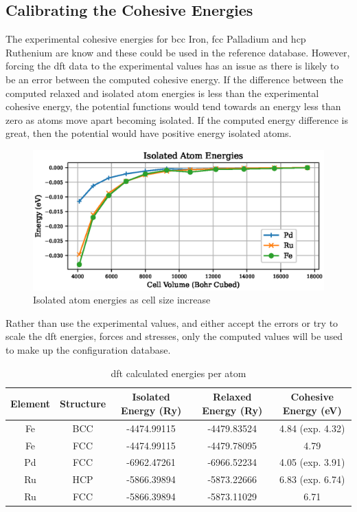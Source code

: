 



\subsection{Calibrating the Cohesive Energies}

The experimental cohesive energies for \acrshort{bcc} Iron, \acrshort{fcc} Palladium and \acrshort{hcp} Ruthenium are know and these could be used in the reference database.  However, forcing the \acrshort{dft} data to the experimental values has an issue as there is likely to be an error between the computed cohesive energy.  If the difference between the computed relaxed and isolated atom energies is less than the experimental cohesive energy, the potential functions would tend towards an energy less than zero as atoms move apart becoming isolated.  If the computed energy difference is great, then the potential would have positive energy isolated atoms.  

\begin{figure}[h]
\begin{center}
\includegraphics[width=0.5\linewidth]{chapters/results_dft_reference_db/isolated/isolated_63.eps}
\caption{Isolated atom energies as cell size increase}
\label{fig:isolatedatoms}
\end{center}
\end{figure}

Rather than use the experimental values, and either accept the errors or try to scale the \acrshort{dft} energies, forces and stresses, only the computed values will be used to make up the configuration database.

\begin{table}[h]
\begin{center}
\begin{tabular}{c c c c c}
\hline\hline
Element & Structure & Isolated Energy (Ry) & Relaxed Energy (Ry) & Cohesive Energy (eV) \\
\hline\hline
Fe      & BCC       & -4474.99115          & -4479.83524         & 4.84 (exp. 4.32)\\
Fe      & FCC       & -4474.99115          & -4479.78095         & 4.79 \\
Pd      & FCC       & -6962.47261          & -6966.52234         & 4.05 (exp. 3.91)\\
Ru      & HCP       & -5866.39894          & -5873.22666         & 6.83 (exp. 6.74)\\
Ru      & FCC       & -5866.39894          & -5873.11029         & 6.71 \\
\hline\hline
\end{tabular}
\end{center}
\caption{\acrshort{dft} calculated energies per atom}
\label{table:calculatedcohesiveenergies}
\end{table}


